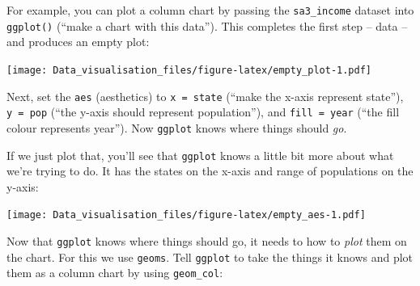 \documentclass[]{book}
\newenvironment{Shaded}{\begin{snugshade}}{\end{snugshade}}
\newcommand{\DataTypeTok}[1]{\textcolor[rgb]{0.13,0.29,0.53}{#1}}
\newcommand{\KeywordTok}[1]{\textcolor[rgb]{0.13,0.29,0.53}{\textbf{#1}}}
\newcommand{\NormalTok}[1]{#1}
\newcommand{\OperatorTok}[1]{\textcolor[rgb]{0.81,0.36,0.00}{\textbf{#1}}}
\newcommand{\StringTok}[1]{\textcolor[rgb]{0.31,0.60,0.02}{#1}}
\begin{document}
For example, you can plot a column chart by passing the \texttt{sa3\_income} dataset into \texttt{ggplot()} (``make a chart with this data''). This completes the first step -- data -- and produces an empty plot:

\begin{Shaded}
\end{Shaded}

\texttt{[image: Data\_visualisation\_files/figure-latex/empty\_plot-1.pdf]}

Next, set the \texttt{aes} (aesthetics) to \texttt{x\ =\ state} (``make the x-axis represent state''), \texttt{y\ =\ pop} (``the y-axis should represent population''), and \texttt{fill\ =\ year} (``the fill colour represents year''). Now \texttt{ggplot} knows where things should \emph{go}.

If we just plot that, you'll see that \texttt{ggplot} knows a little bit more about what we're trying to do. It has the states on the x-axis and range of populations on the y-axis:

\begin{Shaded}
\end{Shaded}

\texttt{[image: Data\_visualisation\_files/figure-latex/empty\_aes-1.pdf]}

Now that \texttt{ggplot} knows where things should go, it needs to how to \emph{plot} them on the chart. For this we use \texttt{geoms}. Tell \texttt{ggplot} to take the things it knows and plot them as a column chart by using \texttt{geom\_col}:

\begin{Shaded}
\end{Shaded}
\end{document}
